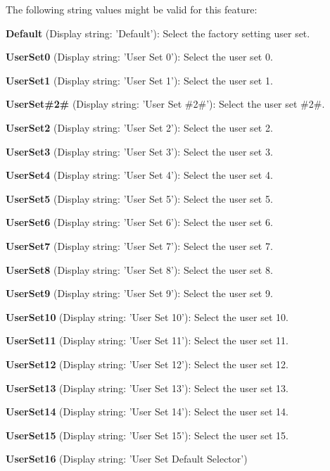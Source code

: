 The following string values might be valid for this feature\+:
\begin{DoxyItemize}
\item {\bfseries Default} (Display string\+: 'Default')\+: Select the factory setting user set.
\item {\bfseries User\+Set0} (Display string\+: 'User Set 0')\+: Select the user set 0.
\item {\bfseries User\+Set1} (Display string\+: 'User Set 1')\+: Select the user set 1.
\item {\bfseries User\+Set\#2\#} (Display string\+: 'User Set \#2\#')\+: Select the user set \#2\#.
\item {\bfseries User\+Set2} (Display string\+: 'User Set 2')\+: Select the user set 2.
\item {\bfseries User\+Set3} (Display string\+: 'User Set 3')\+: Select the user set 3.
\item {\bfseries User\+Set4} (Display string\+: 'User Set 4')\+: Select the user set 4.
\item {\bfseries User\+Set5} (Display string\+: 'User Set 5')\+: Select the user set 5.
\item {\bfseries User\+Set6} (Display string\+: 'User Set 6')\+: Select the user set 6.
\item {\bfseries User\+Set7} (Display string\+: 'User Set 7')\+: Select the user set 7.
\item {\bfseries User\+Set8} (Display string\+: 'User Set 8')\+: Select the user set 8.
\item {\bfseries User\+Set9} (Display string\+: 'User Set 9')\+: Select the user set 9.
\item {\bfseries User\+Set10} (Display string\+: 'User Set 10')\+: Select the user set 10.
\item {\bfseries User\+Set11} (Display string\+: 'User Set 11')\+: Select the user set 11.
\item {\bfseries User\+Set12} (Display string\+: 'User Set 12')\+: Select the user set 12.
\item {\bfseries User\+Set13} (Display string\+: 'User Set 13')\+: Select the user set 13.
\item {\bfseries User\+Set14} (Display string\+: 'User Set 14')\+: Select the user set 14.
\item {\bfseries User\+Set15} (Display string\+: 'User Set 15')\+: Select the user set 15.
\item {\bfseries User\+Set16} (Display string\+: 'User Set Default Selector')
\end{DoxyItemize}

